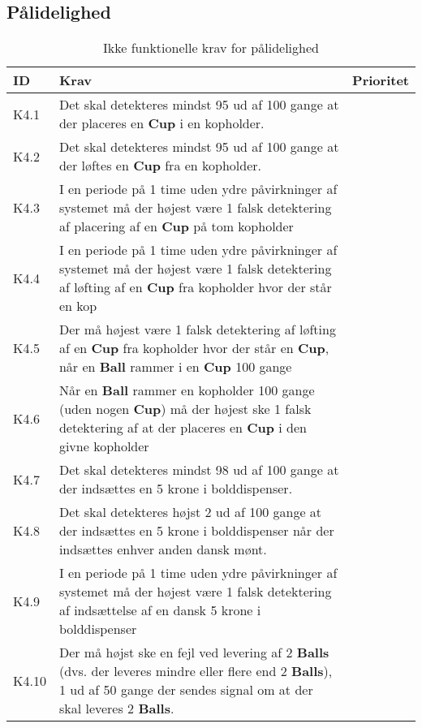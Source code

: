 \documentclass[Kravspecifikation/Kravspec_Main.tex]{subfiles}
\begin{document}
\subsection{Pålidelighed}
\begin{table}[H]
\begin{tabular}{|L{0.1\textwidth}|L{0.75\textwidth}|L{0.15\textwidth}|}
\hline
\textbf{ID} & \textbf{Krav} & \textbf{Prioritet} \\ \hline
K4.1 & Det skal detekteres mindst 95 ud af 100 gange at der placeres en \textbf{Cup} i en kopholder.  &  \\ \hline
K4.2 & Det skal detekteres mindst 95 ud af 100 gange at der løftes en \textbf{Cup} fra en kopholder.  &  \\ \hline
K4.3 & I en periode på 1 time uden ydre påvirkninger af systemet må der højest være 1 falsk detektering af placering af en \textbf{Cup} på tom kopholder &  \\ \hline
K4.4 & I en periode på 1 time uden ydre påvirkninger af systemet må der højest være 1 falsk detektering af løfting af en \textbf{Cup} fra kopholder hvor der står en kop&  \\ \hline
K4.5 & Der må højest være 1 falsk detektering af løfting af en \textbf{Cup} fra kopholder hvor der står en \textbf{Cup}, når en \textbf{Ball} rammer i en \textbf{Cup} 100 gange&  \\ \hline
K4.6 & Når en \textbf{Ball} rammer en kopholder 100 gange (uden nogen \textbf{Cup}) må der højest ske 1 falsk detektering af at der placeres en \textbf{Cup} i den givne kopholder&  \\ \hline
K4.7 & Det skal detekteres mindst 98 ud af 100 gange at der indsættes en 5 krone i bolddispenser. &  \\ \hline
K4.8 & Det skal detekteres højst 2 ud af 100 gange at der indsættes en 5 krone i bolddispenser når der indsættes enhver anden dansk mønt. &  \\ \hline
K4.9 & I en periode på 1 time uden ydre påvirkninger af systemet må der højest være 1 falsk detektering af indsættelse af en dansk 5 krone i bolddispenser &  \\ \hline
K4.10 & Der må højst ske en fejl ved levering af 2 \textbf{Balls} (dvs. der leveres mindre eller flere end 2 \textbf{Balls}), 1 ud af 50 gange der sendes signal om at der skal leveres 2 \textbf{Balls}.  &  \\ \hline


\end{tabular}
\caption{Ikke funktionelle krav for pålidelighed}
\label{tab:reliability}
\end{table}
\end{document}
